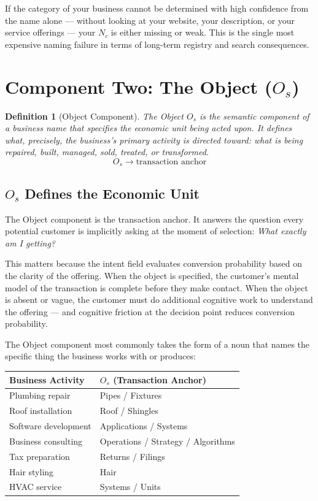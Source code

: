 \documentclass[12pt, openany]{book}
\theoremstyle{thmstyle}
\theoremstyle{defstyle}
\newtheorem{definition}{Definition}[chapter]
\newcommand{\Nc}{N_c}
\newcommand{\Os}{O_s}
\begin{document}
\begin{keybox}
If the category of your business cannot be determined with high confidence from the name alone --- without looking at your website, your description, or your service offerings --- your $\Nc$ is either missing or weak. This is the single most expensive naming failure in terms of long-term registry and search consequences.
\end{keybox}

\section{Component Two: The Object ($O_s$)}

\begin{definition}[Object Component]
The Object $\Os$ is the semantic component of a business name that specifies the economic unit being acted upon. It defines what, precisely, the business's primary activity is directed toward: what is being repaired, built, managed, sold, treated, or transformed.
\[
\Os \rightarrow \text{transaction anchor}
\]
\end{definition}

\subsection{$O_s$ Defines the Economic Unit}

The Object component is the transaction anchor. It answers the question every potential customer is implicitly asking at the moment of selection: \textit{What exactly am I getting?}

This matters because the intent field evaluates conversion probability based on the clarity of the offering. When the object is specified, the customer's mental model of the transaction is complete before they make contact. When the object is absent or vague, the customer must do additional cognitive work to understand the offering --- and cognitive friction at the decision point reduces conversion probability.

The Object component most commonly takes the form of a noun that names the specific thing the business works with or produces:

\begin{center}
\begin{tabular}{ll}
\toprule
\textbf{Business Activity} & \textbf{$\Os$ (Transaction Anchor)} \\
\midrule
Plumbing repair & Pipes / Fixtures \\
Roof installation & Roof / Shingles \\
Software development & Applications / Systems \\
Business consulting & Operations / Strategy / Algorithms \\
Tax preparation & Returns / Filings \\
Hair styling & Hair \\
HVAC service & Systems / Units \\
\bottomrule
\end{tabular}
\end{center}
\end{document}
